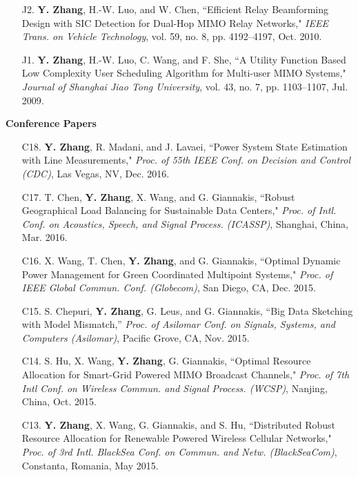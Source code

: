 \documentclass[margin,line]{res}
\begin{document}
\begin{resume}
\begin{enumerate}
\item[J2.]	\textbf{Y. Zhang}, H.-W. Luo, and W. Chen,
``Efficient Relay Beamforming Design with SIC Detection for Dual-Hop MIMO Relay Networks,"
\emph{IEEE Trans. on Vehicle Technology}, vol. 59, no. 8, pp. 4192--4197, Oct. 2010.

\item[J1.]	\textbf{Y. Zhang}, H.-W. Luo, C. Wang, and F. She,
``A Utility Function Based Low Complexity User Scheduling Algorithm for Multi-user MIMO Systems,"
\emph{Journal of Shanghai Jiao Tong University}, vol. 43, no. 7, pp. 1103--1107, Jul. 2009.


\end{enumerate}

{\bf Conference Papers}

\vspace{.2cm}

\begin{enumerate}

\item[C18.] \textbf{Y. Zhang}, R. Madani, and J. Lavaei,
``Power System State Estimation with Line Measurements,"
\emph{Proc. of 55th IEEE Conf. on Decision and Control (CDC)}, Las Vegas, NV, Dec. 2016.

\item[C17.] T. Chen, \textbf{Y. Zhang}, X. Wang, and G. Giannakis,
``Robust Geographical Load Balancing for Sustainable Data Centers,"
\emph{Proc. of Intl. Conf. on Acoustics, Speech, and Signal Process. (ICASSP)}, Shanghai, China, Mar. 2016.

\item[C16.] X. Wang, T. Chen, \textbf{Y. Zhang}, and G. Giannakis,
``Optimal Dynamic Power Management for Green Coordinated Multipoint Systems,"
\emph{Proc. of IEEE Global Commun. Conf. (Globecom)}, San Diego, CA, Dec. 2015.

\item[C15.] S. Chepuri, \textbf{Y. Zhang}, G. Leus, and G. Giannakis,
``Big Data Sketching with Model Mismatch,''
\emph{Proc. of Asilomar Conf. on Signals, Systems, and Computers (Asilomar)}, Pacific Grove, CA, Nov. 2015.

\item[C14.] S. Hu, X. Wang, \textbf{Y. Zhang}, G. Giannakis,
``Optimal Resource Allocation for Smart-Grid Powered MIMO Broadcast Channels,"
\emph{Proc. of 7th Intl Conf. on Wireless Commun. and Signal Process. (WCSP)}, Nanjing, China, Oct. 2015.

\item[C13.]	\textbf{Y. Zhang}, X. Wang, G. Giannakis, and S. Hu,
``Distributed Robust Resource Allocation for Renewable Powered Wireless Cellular Networks,"
\emph{Proc. of 3rd Intl. BlackSea Conf. on Commun. and Netw. (BlackSeaCom)}, Constanta, Romania, May 2015.


\end{enumerate}
\end{resume}
\end{document}
